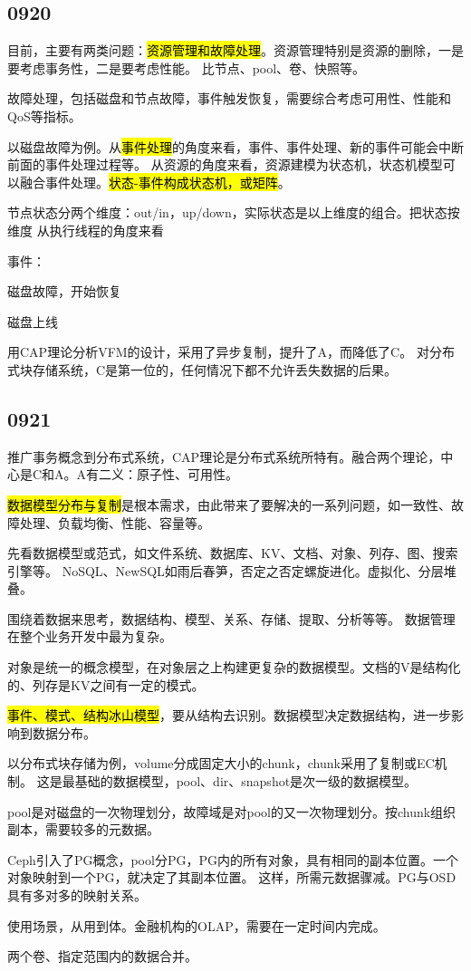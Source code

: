 \subsection{0920}

目前，主要有两类问题：\hl{资源管理和故障处理}。资源管理特别是资源的删除，一是要考虑事务性，二是要考虑性能。
比节点、pool、卷、快照等。

故障处理，包括磁盘和节点故障，事件触发恢复，需要综合考虑可用性、性能和QoS等指标。

以磁盘故障为例。从\hl{事件处理}的角度来看，事件、事件处理、新的事件可能会中断前面的事件处理过程等。
从资源的角度来看，资源建模为状态机，状态机模型可以融合事件处理。\hl{状态-事件构成状态机，或矩阵}。

节点状态分两个维度：out/in，up/down，实际状态是以上维度的组合。把状态按维度 
从执行线程的角度来看

事件：
\begin{enumbox}
\item 磁盘故障，开始恢复
\item 磁盘上线
\end{enumbox}

用CAP理论分析VFM的设计，采用了异步复制，提升了A，而降低了C。
对分布式块存储系统，C是第一位的，任何情况下都不允许丢失数据的后果。

\subsection{0921}

推广事务概念到分布式系统，CAP理论是分布式系统所特有。融合两个理论，中心是C和A。A有二义：原子性、可用性。

\hl{数据模型分布与复制}是根本需求，由此带来了要解决的一系列问题，如一致性、故障处理、负载均衡、性能、容量等。

先看数据模型或范式，如文件系统、数据库、KV、文档、对象、列存、图、搜索引擎等。
NoSQL、NewSQL如雨后春笋，否定之否定螺旋进化。虚拟化、分层堆叠。

围绕着数据来思考，数据结构、模型、关系、存储、提取、分析等等。
数据管理在整个业务开发中最为复杂。

对象是统一的概念模型，在对象层之上构建更复杂的数据模型。文档的V是结构化的、列存是KV之间有一定的模式。

\hl{事件、模式、结构冰山模型}，要从结构去识别。数据模型决定数据结构，进一步影响到数据分布。

以分布式块存储为例，volume分成固定大小的chunk，chunk采用了复制或EC机制。
这是最基础的数据模型，pool、dir、snapshot是次一级的数据模型。

pool是对磁盘的一次物理划分，故障域是对pool的又一次物理划分。按chunk组织副本，需要较多的元数据。

Ceph引入了PG概念，pool分PG，PG内的所有对象，具有相同的副本位置。一个对象映射到一个PG，就决定了其副本位置。
这样，所需元数据骤减。PG与OSD具有多对多的映射关系。

使用场景，从用到体。金融机构的OLAP，需要在一定时间内完成。

两个卷、指定范围内的数据合并。
